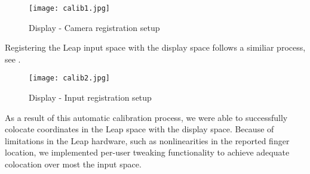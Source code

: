 \begin{figure}
    \centering
    \texttt{[image: calib1.jpg]}
    \caption{Display - Camera registration setup}
    \label{fig:calib1}
\end{figure}

Registering the Leap input space with the display space follows a similiar process, see .

\begin{figure}
    \centering
    \texttt{[image: calib2.jpg]}
    \caption{Display - Input registration setup}
    \label{fig:calib2}
\end{figure}

As a result of this automatic calibration process, we were able to
successfully colocate coordinates in the Leap space with the display space.
Because of limitations in the Leap hardware, such as nonlinearities in the
reported finger location, we implemented per-user tweaking functionality to
achieve adequate colocation over most the input space.
